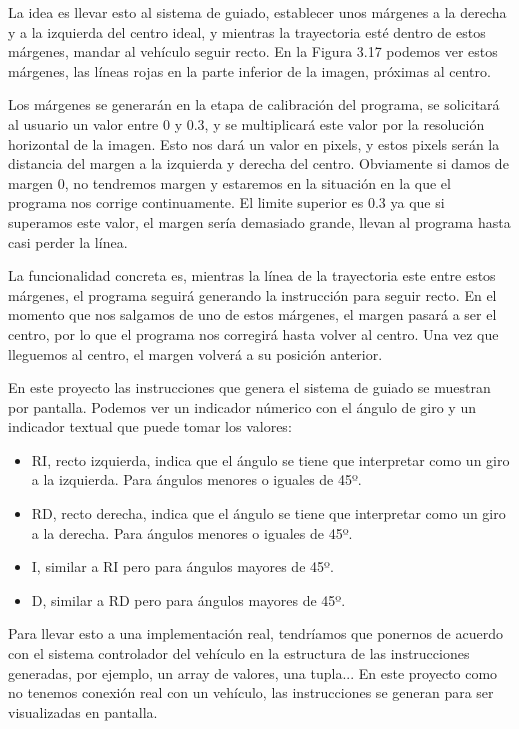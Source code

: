 La idea es llevar esto al sistema de guiado, establecer unos márgenes a la derecha y a la izquierda del centro ideal, y mientras la trayectoria esté dentro de estos márgenes, mandar al vehículo seguir recto. En la Figura 3.17 podemos ver estos márgenes, las líneas rojas en la parte inferior de la imagen, próximas al centro.

Los márgenes se generarán en la etapa de calibración del programa, se solicitará al usuario un valor entre 0 y 0.3, y se multiplicará este valor por la resolución horizontal de la imagen. Esto nos dará un valor en pixels, y estos pixels serán la distancia del margen a la izquierda y derecha del centro. Obviamente si damos de margen 0, no tendremos margen y estaremos en la situación en la que el programa nos corrige continuamente. El limite superior es 0.3 ya que si superamos este valor, el margen sería demasiado grande, llevan al programa hasta casi perder la línea.

La funcionalidad concreta es, mientras la línea de la trayectoria este entre estos márgenes, el programa seguirá generando la instrucción para seguir recto. En el momento que nos salgamos de uno de estos márgenes, el margen pasará a ser el centro, por lo que el programa nos corregirá hasta volver al centro. Una vez que lleguemos al centro, el margen volverá a su posición anterior.

En este proyecto las instrucciones que genera el sistema de guiado se muestran por pantalla. Podemos ver un indicador númerico con el ángulo de giro y un indicador textual que puede tomar los valores:

\begin{itemize}

	\item RI, recto izquierda, indica que el ángulo se tiene que interpretar como un giro a la izquierda. Para ángulos menores o iguales de 45º.
	
	\item RD, recto derecha, indica que el ángulo se tiene que interpretar como un giro a la derecha. Para ángulos menores o iguales de 45º.
	\item I, similar a RI pero para ángulos mayores de 45º.
	
	\item D, similar a RD pero para ángulos mayores de 45º.
	
\end{itemize}

Para llevar esto a una implementación real, tendríamos que ponernos de acuerdo con el sistema controlador del vehículo en la estructura de las instrucciones generadas, por ejemplo, un array de valores, una tupla... 
En este proyecto como no tenemos conexión real con un vehículo, las instrucciones se generan para ser visualizadas en pantalla.

